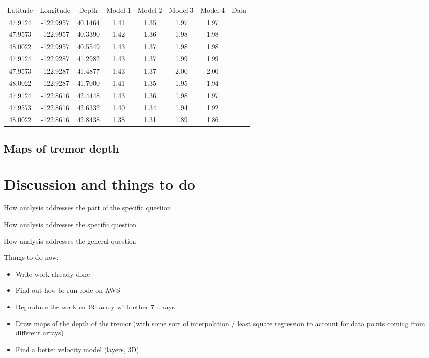 \documentclass[main.tex]{subfiles}
\begin{document}
\begin{center}
\begin{tabular}{| c | c | c | c | c | c | c | c |}
  \hline
  Latitude & Longitude & Depth & Model 1 & Model 2 & Model 3 & Model 4 & Data \\
  47.9124 & -122.9957 & 40.1464 & 1.41 & 1.35 & 1.97 & 1.97 & \\
  47.9573 & -122.9957 & 40.3390 & 1.42 & 1.36 & 1.98 & 1.98 & \\
  48.0022 & -122.9957 & 40.5549 & 1.43 & 1.37 & 1.98 & 1.98 & \\
  47.9124 & -122.9287 & 41.2982 & 1.43 & 1.37 & 1.99 & 1.99 & \\
  47.9573 & -122.9287 & 41.4877 & 1.43 & 1.37 & 2.00 & 2.00 & \\
  48.0022 & -122.9287 & 41.7000 & 1.41 & 1.35 & 1.95 & 1.94 & \\
  47.9124 & -122.8616 & 42.4448 & 1.43 & 1.36 & 1.98 & 1.97 & \\
  47.9573 & -122.8616 & 42.6332 & 1.40 & 1.34 & 1.94 & 1.92 & \\
  48.0022 & -122.8616 & 42.8438 & 1.38 & 1.31 & 1.89 & 1.86 & \\
  \hline
\end{tabular}
\captionsetup{type=table}
\end{center}

\section{Maps of tremor depth}

\chapter{Discussion and things to do}

How analysis addresses the part of the specific question

How analysis addresses the specific question

How analysis addresses the general question

Things to do now:

\begin{itemize}
	\item Write work already done
	\item Find out how to run code on AWS
	\item Reproduce the work on BS array with other 7 arrays
	\item Draw maps of the depth of the tremor (with some sort of interpolation / least square regression to account for data points coming from different arrays)
	\item Find a better velocity model (layers, 3D)
\end{itemize}
\end{document}
